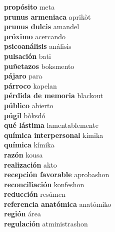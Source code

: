 \textbf{ propósito  } meta \\
\textbf{ prunus armeniaca  } aprikòt \\
\textbf{ prunus dulcis  } amandel \\
\textbf{ próximo  } acercando \\
\textbf{ psicoanálisis  } análisis \\
\textbf{ pulsación  } bati \\
\textbf{ puñetazos  } boksmento \\
\textbf{ pájaro  } para \\
\textbf{ párroco  } kapelan \\
\textbf{ pérdida de memoria  } blackout \\
\textbf{ público  } abierto \\
\textbf{ púgil  } bòksdó \\
\textbf{ qué lástima  } lamentablemente \\
\textbf{ química interpersonal  } kímika \\
\textbf{ química  } kímika \\
\textbf{ razón  } kousa \\
\textbf{ realización  } akto \\
\textbf{ recepción favorable  } aprobashon \\
\textbf{ reconciliación  } konfeshon \\
\textbf{ reducción  } resúmen \\
\textbf{ referencia anatómica  } anatómiko \\
\textbf{ región  } área \\
\textbf{ regulación  } atministrashon \\
